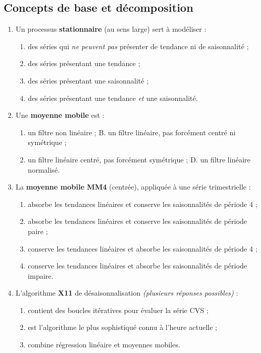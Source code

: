 \documentclass[11pt]{article}
\begin{document}
\subsection{Concepts de base et décomposition}
\begin{enumerate}[label=\textbf{Q\,A.\arabic*},leftmargin=*]
\item Un processus \textbf{stationnaire} (au sens large) sert à modéliser :
\begin{enumerate}[label=\Alph*.,nosep]
  \item des séries qui \emph{ne peuvent pas} présenter de tendance ni de saisonnalité ;
  \item des séries présentant une tendance ;
  \item des séries présentant une saisonnalité ;
  \item des séries présentant une tendance \emph{et} une saisonnalité.
\end{enumerate}

\item Une \textbf{moyenne mobile} est :
\begin{enumerate}[label=\Alph*.,nosep]
  \item un filtre non linéaire ; \quad B. un filtre linéaire, pas forcément centré ni symétrique ;
  \item un filtre linéaire centré, pas forcément symétrique ; \quad D. un filtre linéaire normalisé.
\end{enumerate}

\item La \textbf{moyenne mobile MM4} (centrée), appliquée à une série trimestrielle :
\begin{enumerate}[label=\Alph*.,nosep]
  \item absorbe les tendances linéaires et conserve les saisonnalités de période 4 ;
  \item absorbe les tendances linéaires et conserve les saisonnalités de période paire ;
  \item conserve les tendances linéaires et absorbe les saisonnalités de période 4 ;
  \item conserve les tendances linéaires et absorbe les saisonnalités de période impaire.
\end{enumerate}

\item L'algorithme \textbf{X11} de désaisonnalisation \emph{(plusieurs réponses possibles)} :
\begin{enumerate}[label=\Alph*.,nosep]
  \item contient des boucles itératives pour évaluer la série CVS ;
  \item est l'algorithme le plus sophistiqué connu à l'heure actuelle ;
  \item combine régression linéaire et moyennes mobiles.
\end{enumerate}


\end{enumerate}
\end{document}
